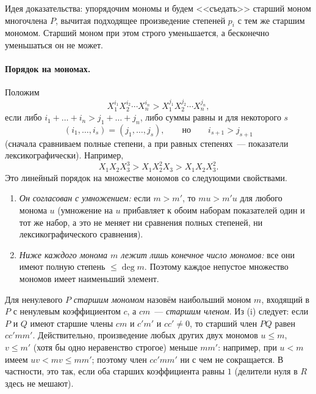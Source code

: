 Идея доказательства: упорядочим мономы и будем <<съедать>> старший моном многочлена $P$, вычитая подходящее произведение
степеней $p_i$ с тем же старшим мономом. Старший моном при этом строго уменьшается, а бесконечно уменьшаться он не может.

\paragraph{Порядок на мономах.} Положим
\[
X_1^{i_1}X_2^{i_2}\cdots X_n^{i_n}>X_1^{j_1}X_2^{j_2}\cdots X_n^{j_n},
\]
если либо $i_1+\dots+i_n>j_1+\dots+j_n$, либо суммы равны и для некоторого $s$
\[
(i_1,\dots,i_s)=(j_1,\dots,j_s),\qquad\text{но}\qquad i_{s+1}>j_{s+1}
\]
(сначала сравниваем полные степени, а при равных степенях~--- показатели лексикографически). Например,
\[
X_1X_2X_3^3>X_1X_2^2X_3>X_1X_2X_3^2 .
\]
Это линейный порядок на множестве мономов со следующими свойствами.
\begin{enumerate}[label=\textup{(\roman*)}]
\item \emph{Он согласован с умножением:} если $m>m'$, то $mu>m'u$ для любого монома $u$ (умножение на $u$ прибавляет к
обоим наборам показателей один и тот же набор, а это не меняет ни сравнения полных степеней, ни лексикографического
сравнения).
\item \emph{Ниже каждого монома $m$ лежит лишь конечное число мономов:} все они имеют полную степень $\le\deg m$. Поэтому
каждое непустое множество мономов имеет наименьший элемент.
\end{enumerate}
Для ненулевого $P$ \emph{старшим мономом} назовём наибольший моном $m$, входящий в $P$ с ненулевым коэффициентом $c$,
а $cm$~--- \emph{старшим членом}. Из (i)
следует: если $P$ и $Q$ имеют старшие члены $cm$ и $c'm'$ и $cc'\ne0$, то старший член $PQ$ равен $cc'mm'$. Действительно,
произведение любых других двух мономов $u\le m$, $v\le m'$ (хотя бы одно неравенство строгое) меньше $mm'$: например, при
$u<m$ имеем $uv<mv\le mm'$; поэтому член $cc'mm'$ ни с чем не сокращается. В частности, это так, если оба старших
коэффициента равны $1$ (делители нуля в $R$ здесь не мешают).

